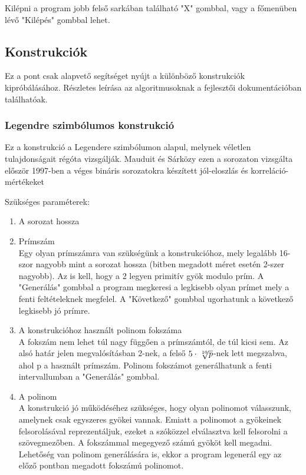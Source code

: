 \documentclass[hidelinks, 12pt]{article}
\begin{document}
	Kilépni a program jobb felső sarkában található "X" gombbal, vagy a főmenüben lévő "Kilépés" gombbal lehet.

	\subsection*{Konstrukciók}
	Ez a pont csak alapvető segítséget nyújt a különböző konstrukciók kipróbálásához. Részletes leírása az algoritmusoknak a fejlesztői dokumentációban találhatóak.
	\par
	\subsubsection{Legendre szimbólumos konstrukció}
		Ez a konstrukció a Legendere szimbólumon alapul, melynek véletlen tulajdonságait régóta vizsgálják. Mauduit és Sárközy ezen a sorozaton vizsgálta először 1997-ben a véges bináris sorozatokra készített jól-eloszlás és korreláció-mértékeket \cite{sarkozymauduit}
	\par
	Szükséges paraméterek:
	\begin{enumerate}\bfseries
		\item A sorozat hossza
		\\ 
		\bfseries \item Prímszám
		\\ \normalfont Egy olyan prímszámra van szükségünk a konstrukcióhoz, mely legalább 16-szor nagyobb mint a sorozat hossza (bitben megadott méret esetén 2-szer nagyobb). Az is kell, hogy a 2 legyen primitív gyök modulo prím. A "Generálás" gombbal a program megkeresi a legkisebb olyan prímet mely a fenti feltételeknek megfelel. A "Következő" gombbal ugorhatunk a következő legkisebb jó prímre.
		\bfseries \item A konstrukcióhoz használt polinom fokszáma \\ \normalfont
		A fokszám nem lehet túl nagy függően a prímszámtól, de túl kicsi sem. Az alsó határ jelen megvalósításban 2-nek, a felső $5\cdot\sqrt[\leftroot{-2}\uproot{2}10]{p}$-nek lett megszabva, ahol p a használt prímszám. Polinom fokszámot generálhatunk a fenti intervallumban a "Generálás" gombbal.
		\bfseries \item A polinom \\
		\normalfont
		A konstrukció jó működéséhez szükséges, hogy olyan polinomot válasszunk, amelynek csak egyszeres gyökei vannak. Emiatt a polinomot a gyökeinek felsorolásával reprezentáljuk, ezeket a szóközzel elválasztva kell felsorolni a szövegmezőben. A fokszámmal megegyező számú gyököt kell megadni. Lehetőség van polinom generálására is, ekkor a program legenerál egy az előző pontban megadott fokszámú polinomot.
	\end{enumerate}
	
\end{document}
